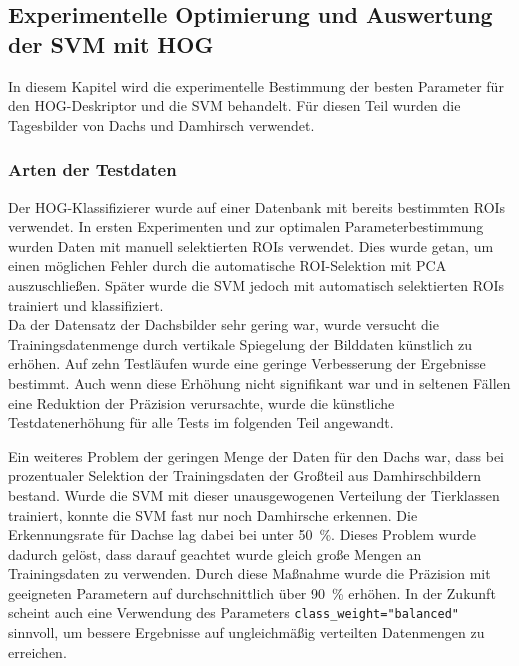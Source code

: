 \subsection{Experimentelle Optimierung und Auswertung der SVM mit HOG} \label{sec:HOG_parameter_and_results}
In diesem Kapitel wird die experimentelle Bestimmung der besten Parameter für den HOG-Deskriptor und die SVM behandelt. Für diesen Teil wurden die Tagesbilder von Dachs und Damhirsch verwendet.


\subsubsection{Arten der Testdaten} \label{sssec:test_data_HOG}
Der HOG-Klassifizierer wurde auf einer Datenbank mit bereits bestimmten ROIs verwendet. In ersten Experimenten und zur optimalen Parameterbestimmung wurden Daten mit manuell selektierten ROIs verwendet. Dies wurde getan, um einen möglichen Fehler durch die automatische ROI-Selektion mit PCA auszuschließen. Später wurde die SVM jedoch mit automatisch selektierten ROIs trainiert und klassifiziert.\\ 
Da der Datensatz der Dachsbilder sehr gering war, wurde versucht die Trainingsdatenmenge durch vertikale Spiegelung der Bilddaten künstlich zu erhöhen. Auf zehn Testläufen wurde eine geringe Verbesserung der Ergebnisse bestimmt. Auch wenn diese Erhöhung nicht signifikant war und in seltenen Fällen eine Reduktion der Präzision verursachte, wurde die künstliche Testdatenerhöhung für alle Tests im folgenden Teil angewandt. 

Ein weiteres Problem der geringen Menge der Daten für den Dachs war, dass bei prozentualer Selektion der Trainingsdaten der Großteil aus Damhirschbildern bestand. Wurde die SVM mit dieser unausgewogenen Verteilung der Tierklassen trainiert, konnte die SVM fast nur noch Damhirsche erkennen. Die Erkennungsrate für Dachse lag dabei bei unter 50~\%. Dieses Problem wurde dadurch gelöst, dass darauf geachtet wurde gleich große Mengen an Trainingsdaten zu verwenden. Durch diese Maßnahme wurde die Präzision mit geeigneten Parametern auf durchschnittlich über 90~\% erhöhen. In der Zukunft scheint auch eine Verwendung des Parameters \texttt{class\_weight="balanced"} sinnvoll, um bessere Ergebnisse auf ungleichmäßig verteilten Datenmengen zu erreichen.

